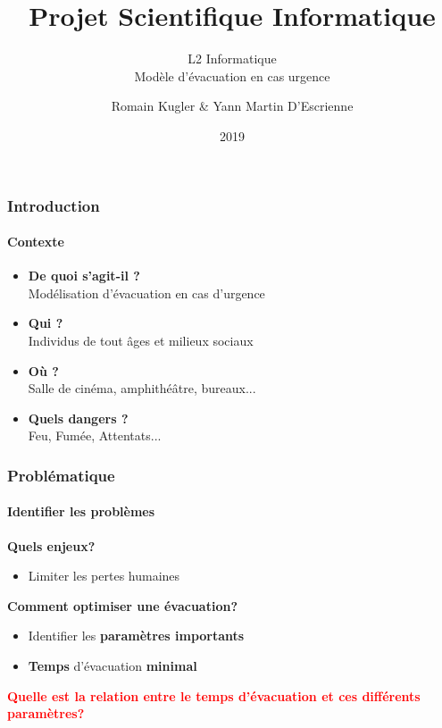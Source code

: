 \documentclass{beamer}
\begin{document}
\title{Projet Scientifique Informatique}
	\subtitle{L2 Informatique \\
	Modèle d'évacuation en cas urgence  }
	\author {Romain Kugler \& Yann Martin D'Escrienne}
	\date{2019}
	
\begin{frame} \titlepage \end{frame}

\begin{frame}
	\frametitle{Introduction}
	\framesubtitle{Contexte}
	
	\begin{block}{}
	\begin{itemize}
		\item \textbf{De quoi s'agit-il ?} \\
		Modélisation d'évacuation en cas d'urgence\\
		\item \textbf{Qui ?}\\
		Individus de tout âges et milieux sociaux \\
		\item \textbf{Où ?}\\
		Salle de cinéma, amphithéâtre, bureaux...\\
		\item \textbf{Quels dangers ?}\\
		Feu, Fumée, Attentats...
	\end{itemize}
	\end{block}	
\end{frame}



\begin{frame}
	\frametitle{Problématique}
	\framesubtitle{Identifier les problèmes}
	
	\begin{block}{\textbf{Quels enjeux?}}
	\begin{itemize}
		\smallskip
		\item Limiter les pertes humaines	
	\end{itemize}
	\end{block}
	
	\medskip
	
	\begin{block}{\textbf{Comment optimiser une évacuation?}}
	\begin{itemize}
		\medskip
		\item Identifier les \textbf{paramètres importants}
		\smallskip 
		\item \textbf{Temps} d'évacuation \textbf{minimal}\\
	\end{itemize}
	\end{block}
	
	\medskip
	
	\begin{block}{\textbf{\textcolor{red}{Quelle est la relation entre le temps d'évacuation et ces différents paramètres?}}}
	\end{block}	
	
\end{frame}
\end{document}
